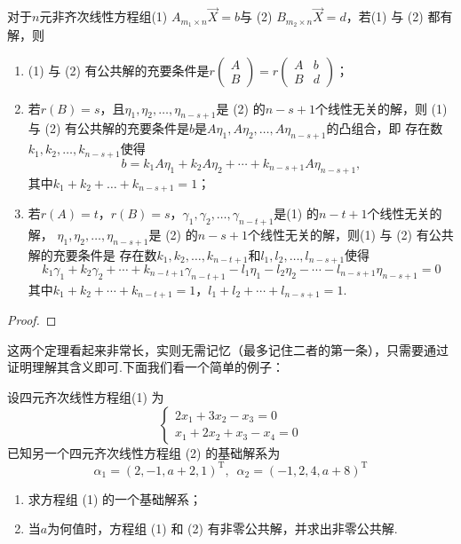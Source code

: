 \begin{theorem}
    对于$n$元非齐次线性方程组(1) $A_{m_1 \times n}\vec{X}=b$与 (2) $B_{m_2 \times n}\vec{X}=d$，若(1) 与 (2) 都有解，则
    \begin{enumerate}
        \item (1) 与 (2) 有公共解的充要条件是$r\begin{pmatrix}
                A \\ B
            \end{pmatrix}=r\begin{pmatrix}
                A & b \\ B & d
            \end{pmatrix}$；

        \item 若$r(B)=s$，且$\eta_1,\eta_2,\ldots,\eta_{n-s+1}$是 (2) 的$n-s+1$个线性无关的解，则
        (1) 与 (2) 有公共解的充要条件是$b$是$A\eta_1,A\eta_2,\ldots,A\eta_{n-s+1}$的凸组合，即
        存在数$k_1,k_2,\ldots,k_{n-s+1}$使得
        \[b=k_1A\eta_1+k_2A\eta_2+\cdots+k_{n-s+1}A\eta_{n-s+1},\]
        其中$k_1+k_2+\ldots+k_{n-s+1}=1$；

        \item 若$r(A)=t$，$r(B)=s$，$\gamma_1,\gamma_2,\ldots,\gamma_{n-t+1}$是(1) 的$n-t+1$个线性无关的解，
        $\eta_1,\eta_2,\ldots,\eta_{n-s+1}$是 (2) 的$n-s+1$个线性无关的解，则(1) 与 (2) 有公共解的充要条件是
        存在数$k_1,k_2,\ldots,k_{n-t+1}$和$l_1,l_2,\ldots,l_{n-s+1}$使得
        \[k_1\gamma_1+k_2\gamma_2+\cdots+k_{n-t+1}\gamma_{n-t+1}-l_1\eta_1-l_2\eta_2-\cdots-l_{n-s+1}\eta_{n-s+1}=0\]
        其中$k_1+k_2+\cdots+k_{n-t+1}=1$，$l_1+l_2+\cdots+l_{n-s+1}=1$.
    \end{enumerate}
\end{theorem}
\begin{proof}
    
\end{proof}

这两个定理看起来非常长，实则无需记忆（最多记住二者的第一条），只需要通过证明理解其含义即可.下面我们看一个简单的例子：
\begin{example}
    设四元齐次线性方程组(1) 为\[\begin{cases}
        2x_1+3x_2-x_3=0 \\ x_1+2x_2+x_3-x_4=0
    \end{cases}\]已知另一个四元齐次线性方程组 (2) 的基础解系为
    \[\alpha_1=(2,-1,a+2,1)^\mathrm{T},\enspace\alpha_2=(-1,2,4,a+8)^\mathrm{T}\]
    \begin{enumerate}
        \item 求方程组 (1) 的一个基础解系；

        \item 当$a$为何值时，方程组 (1) 和 (2) 有非零公共解，并求出非零公共解.
    \end{enumerate}
\end{example}
\begin{solution}

\end{solution}

